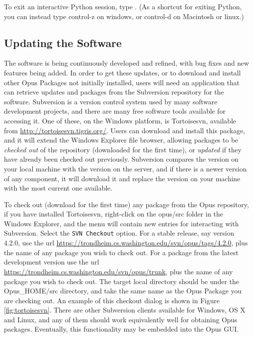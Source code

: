 To exit an interactive Python session, type .  (As a shortcut
for exiting Python, you can instead type control-z on windows, or control-d
on Macintosh or linux.)

\subsection{Updating the Software}

The software is being continuously developed and refined, with bug fixes
and new features being added.  In order to get these updates, or to
download and install other Opus Packages not initially installed, users
will need an application that can retrieve updates and packages from the
Subversion repository for the software.  Subversion is a version control
system used by many software development projects, and there are many free
software tools available for accessing it.  One of these, on the Windows
platform, is Tortoisesvn, available from \url{http://tortoisesvn.tigris.org/}.
Users can download and install this package, and it will extend the Windows
Explorer file browser, allowing packages to be \emph{checked out} of the
repository (downloaded for the first time), or \emph{updated} if they have
already been checked out previously.  Subversion compares the version on
your local machine with the version on the server, and if there is a newer
version of any component, it will download it and replace the version on
your machine with the most current one available.

To check out (download for the first time) any package from the Opus
repository, if you have installed Tortoisesvn, right-click on the opus/src
folder in the Windows Explorer, and the menu will contain new entries for
interacting with Subversion.  Select the \verb#SVN Checkout# option.  For a
stable release, say version 4.2.0, use the url
\url{https://trondheim.cs.washington.edu/svn/opus/tags/4.2.0}, plus the
name of any package you wish to check out.  For a package from the latest
development version use the url
\url{https://trondheim.cs.washington.edu/svn/opus/trunk}, plus the name of
any package you wish to check out.  The target local directory should be
under the Opus\_HOME/src directory, and take the same name as the Opus
Package you are checking out.  An example of this checkout dialog is shown
in Figure \ref{fig:tortoisesvn}.  There are other Subversion clients
available for Windows, OS X and Linux, and any of them should work
equivalently well for obtaining Opus packages.  Eventually, this
functionality may be embedded into the Opus GUI.

